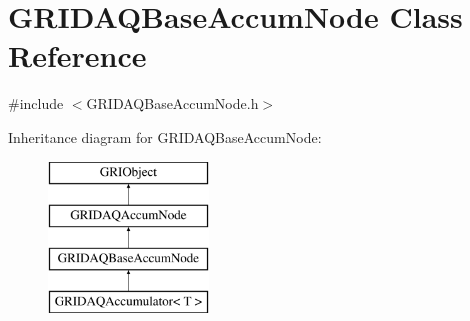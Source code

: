 \hypertarget{classGRIDAQBaseAccumNode}{\section{\-G\-R\-I\-D\-A\-Q\-Base\-Accum\-Node \-Class \-Reference}
\label{classGRIDAQBaseAccumNode}
}


{\ttfamily \#include $<$\-G\-R\-I\-D\-A\-Q\-Base\-Accum\-Node.\-h$>$}

\-Inheritance diagram for \-G\-R\-I\-D\-A\-Q\-Base\-Accum\-Node\-:\begin{figure}[H]
\begin{center}
\leavevmode
\includegraphics[height=4.000000cm]{classGRIDAQBaseAccumNode}
\end{center}
\end{figure}
